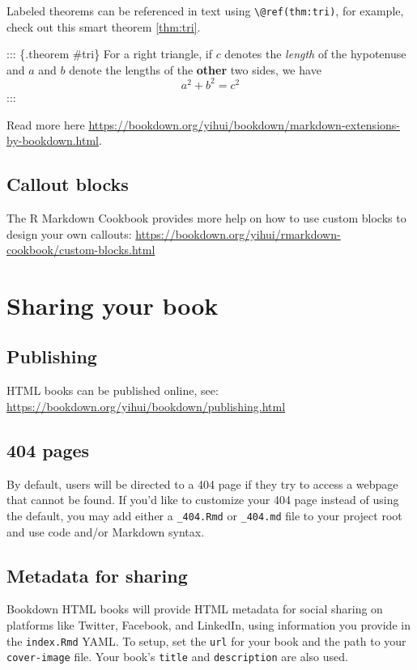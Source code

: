 \documentclass[]{book}
\begin{document}
Labeled theorems can be referenced in text using
\texttt{\textbackslash{}@ref(thm:tri)}, for example, check out this
smart theorem \ref{thm:tri}.

::: \{.theorem \#tri\} For a right triangle, if \(c\) denotes the
\emph{length} of the hypotenuse and \(a\) and \(b\) denote the lengths
of the \textbf{other} two sides, we have \[a^2 + b^2 = c^2\] :::

Read more here
\url{https://bookdown.org/yihui/bookdown/markdown-extensions-by-bookdown.html}.

\section{Callout blocks}\label{callout-blocks}

The R Markdown Cookbook provides more help on how to use custom blocks
to design your own callouts:
\url{https://bookdown.org/yihui/rmarkdown-cookbook/custom-blocks.html}

\chapter{Sharing your book}\label{sharing-your-book}

\section{Publishing}\label{publishing}

HTML books can be published online, see:
\url{https://bookdown.org/yihui/bookdown/publishing.html}

\section{404 pages}\label{pages}

By default, users will be directed to a 404 page if they try to access a
webpage that cannot be found. If you'd like to customize your 404 page
instead of using the default, you may add either a \texttt{\_404.Rmd} or
\texttt{\_404.md} file to your project root and use code and/or Markdown
syntax.

\section{Metadata for sharing}\label{metadata-for-sharing}

Bookdown HTML books will provide HTML metadata for social sharing on
platforms like Twitter, Facebook, and LinkedIn, using information you
provide in the \texttt{index.Rmd} YAML. To setup, set the \texttt{url}
for your book and the path to your \texttt{cover-image} file. Your
book's \texttt{title} and \texttt{description} are also used.
\end{document}
